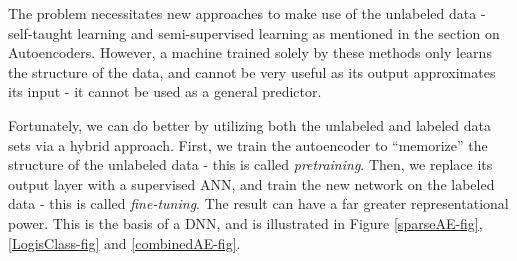 \documentclass[12pt]{article}  %
\begin{document}
The problem necessitates new approaches to make use of the unlabeled data - self-taught learning and semi-supervised learning as mentioned in the section on Autoencoders. However, a machine trained solely by these methods only learns the structure of the data, and cannot be very useful as its output approximates its input - it cannot be used as a general predictor.

Fortunately, we can do better by utilizing both the unlabeled and labeled data sets via a hybrid approach. First, we train the autoencoder to ``memorize'' the structure of the unlabeled data - this is called \emph{pretraining}. Then, we replace its output layer with a supervised ANN, and train the new network on the labeled data - this is called \emph{fine-tuning}. The result can have a far greater representational power. This is the basis of a DNN, and is illustrated in Figure \ref{sparseAE-fig}, \ref{LogisClass-fig} and \ref{combinedAE-fig}.
\end{document}

